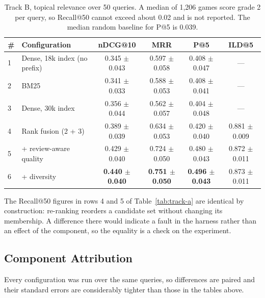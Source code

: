 \begin{table}[h]
\centering
\caption{Track B, topical relevance over 50 queries. A median of 1,206 games
score grade 2 per query, so Recall@50 cannot exceed about 0.02 and is not
reported. The median random baseline for P@5 is 0.039.}
\label{tab:track-b}
\small
\begin{tabular}{llcccc}
\hline
\textbf{\#} & \textbf{Configuration} & \textbf{nDCG@10} & \textbf{MRR} & \textbf{P@5} & \textbf{ILD@5} \\
\hline
1 & Dense, 18k index (no prefix) & 0.345 $\pm$ 0.043 & 0.597 $\pm$ 0.058 & 0.408 $\pm$ 0.047 & --- \\
2 & BM25                         & 0.341 $\pm$ 0.033 & 0.588 $\pm$ 0.053 & 0.408 $\pm$ 0.041 & --- \\
3 & Dense, 30k index             & 0.356 $\pm$ 0.044 & 0.562 $\pm$ 0.057 & 0.404 $\pm$ 0.048 & --- \\
4 & Rank fusion (2 + 3)          & 0.389 $\pm$ 0.039 & 0.634 $\pm$ 0.053 & 0.420 $\pm$ 0.040 & 0.881 $\pm$ 0.009 \\
5 & \quad + review-aware quality & 0.429 $\pm$ 0.040 & 0.724 $\pm$ 0.050 & 0.480 $\pm$ 0.043 & 0.872 $\pm$ 0.011 \\
6 & \quad\quad + diversity       & \textbf{0.440 $\pm$ 0.040} & \textbf{0.751 $\pm$ 0.050} & \textbf{0.496 $\pm$ 0.043} & 0.873 $\pm$ 0.011 \\
\hline
\end{tabular}
\end{table}

The Recall@50 figures in rows 4 and 5 of Table~\ref{tab:track-a} are identical
by construction: re-ranking reorders a candidate set without changing its
membership. A difference there would indicate a fault in the harness rather
than an effect of the component, so the equality is a check on the experiment.

\subsection{Component Attribution}
\label{sec:eval-attribution}

Every configuration was run over the same queries, so differences are paired
and their standard errors are considerably tighter than those in the tables
above.

